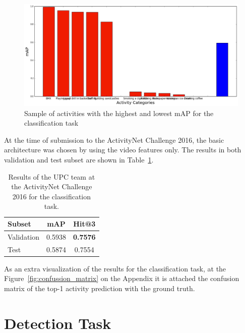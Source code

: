 \begin{figure}[H]
\begin{center}
\includegraphics[width=1\linewidth]{img/results/high_low_map_classification}
\end{center}
\caption{Sample of activities with the highest and lowest mAP for the classification task}
\label{fig:map_by_activity_classification}
\end{figure}



At the time of submission to the ActivityNet Challenge 2016, the basic architecture was chosen by using the video features only. The results in both validation and test subset are shown in Table~\ref{table:classification_results_challenge}.

\begin{table}[H]
\begin{center}
\begin{tabular}{|l|c|c|}
\hline
Subset & mAP & Hit@3 \\
\hline\hline
Validation & 0.5938 & \bf0.7576 \\
Test & 0.5874 & 0.7554 \\
\hline
\end{tabular}
\end{center}
\caption{Results of the UPC team at the ActivityNet Challenge 2016 for the classification task.}
\label{table:classification_results_challenge}
\end{table}

As an extra visualization of the results for the classification task, at the Figure~\ref{fig:confussion_matrix} on the Appendix it is attached the confusion matrix of the top-1 activity prediction with the ground truth.



\section{Detection Task}

